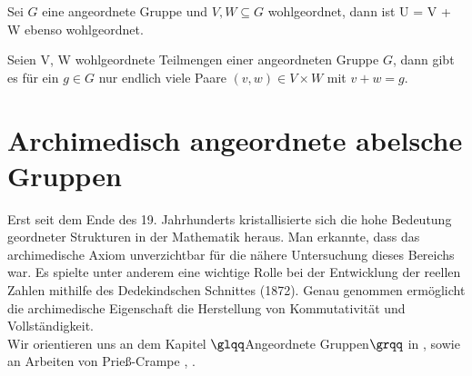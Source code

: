 \begin{lemma} \label{LemmaNeumann} %
Sei $G$ eine angeordnete Gruppe und $V, W \subseteq G$ wohlgeordnet, dann ist U = V + W ebenso wohlgeordnet. 
\end{lemma}
%
%
% 
%
%
%
%
\begin{folg}\label{FolgerungNeumann} %
Seien V, W wohlgeordnete Teilmengen einer angeordneten Gruppe $G$, dann gibt es für ein $g \in G$ nur endlich viele Paare $\left(v, w\right) \in V\times W$ mit $v + w = g$.
\end{folg}
%
%
%
%
%
%
%
%
%
%
\section{Archimedisch angeordnete abelsche Gruppen}\label{Archimedisch angeordnete Gruppen}
%
Erst seit dem Ende des 19. Jahrhunderts kristallisierte sich die hohe Bedeutung geordneter Strukturen in der Mathematik heraus. Man erkannte, dass das archimedische Axiom unverzichtbar für die nähere Untersuchung dieses Bereichs war. Es spielte unter anderem eine wichtige Rolle bei der Entwicklung der reellen Zahlen mithilfe des Dedekindschen Schnittes (1872). Genau genommen ermöglicht die archimedische Eigenschaft die Herstellung von Kommutativität und Vollständigkeit. \\ %
Wir orientieren uns an dem Kapitel $\glqq$Angeordnete Gruppen$\grqq$ in \cite[S. 73 - 93]{fuchs66}, sowie an Arbeiten von Prieß-Crampe \cite{priesscrampe69}, \cite{priesscrampe83}.

